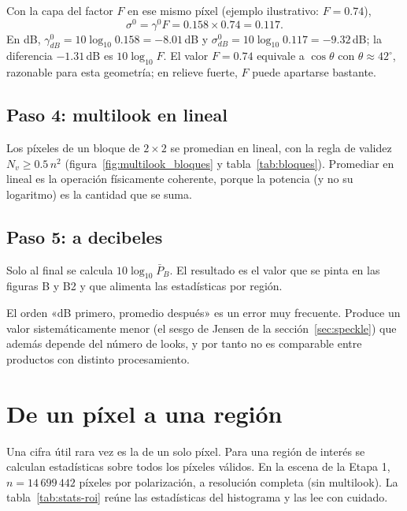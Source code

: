 \documentclass[11pt,a4paper]{article}
\begin{document}
Con la capa del factor $F$ en ese mismo píxel (ejemplo ilustrativo: $F=0.74$),
\begin{equation}
  \sigma^0 = \gamma^0F = 0.158\times0.74 = 0.117 .
\end{equation}
En dB, $\gamma^0_{dB}=10\log_{10}0.158=-8.01$\,dB y $\sigma^0_{dB}=10\log_{10}0.117=-9.32$\,dB; la diferencia
$-1.31$\,dB es $10\log_{10}F$. El valor $F=0.74$ equivale a $\cos\theta$ con $\theta\approx42^\circ$,
razonable para esta geometría; en relieve fuerte, $F$ puede apartarse bastante.

\subsection{Paso 4: multilook en lineal}

Los píxeles de un bloque de $2\times2$ se promedian en lineal, con la regla de validez
$N_v\ge0.5\,n^2$ (figura~\ref{fig:multilook_bloques} y tabla~\ref{tab:bloques}). Promediar en lineal es
la operación físicamente coherente, porque la potencia (y no su logaritmo) es la cantidad que se suma.

\subsection{Paso 5: a decibeles}

Solo al final se calcula $10\log_{10}\bar P_B$. El resultado es el valor que se pinta en las figuras B y B2 y
que alimenta las estadísticas por región.

\begin{cuidado}
El orden «dB primero, promedio después» es un error muy frecuente. Produce un valor sistemáticamente menor
(el sesgo de Jensen de la sección~\ref{sec:speckle}) que además depende del número de looks, y por tanto no es
comparable entre productos con distinto procesamiento.
\end{cuidado}

\section{De un píxel a una región}
\label{sec:region}

Una cifra útil rara vez es la de un solo píxel. Para una región de interés se calculan estadísticas sobre
todos los píxeles válidos. En la escena de la Etapa 1, $n=14\,699\,442$ píxeles por polarización, a resolución
completa (sin multilook). La tabla~\ref{tab:stats-roi} reúne las estadísticas del histograma y las lee con
cuidado.
\end{document}
